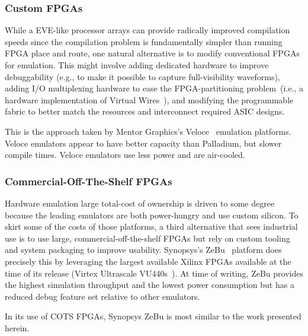 \subsubsection{Custom FPGAs}
While a EVE-like processor arrays can provide radically improved compilation speeds since
the compilation problem is fundamentally simpler than running FPGA place and
route, one natural alternative is to modify conventional FPGAs for emulation.
This might involve adding dedicated hardware to improve debuggability (e.g., to make it
possible to capture full-visibility waveforms), adding I/O multiplexing
hardware to ease the FPGA-partitioning problem~(i.e., a hardware implementation of Virtual Wires~\cite{VirtualWires}), and modifying the programmable
fabric to better match the resources and interconnect required ASIC designs.

This is the approach taken by Mentor Graphics's Veloce~\cite{Veloce} emulation platforms.
Veloce emulators appear to have better capacity than Palladium, but slower
compile times. Veloce emulators use less power and are air-cooled.

\subsubsection{Commercial-Off-The-Shelf FPGAs}

Hardware emulation large total-cost of ownership is driven to some degree
because the leading emulators are both power-hungry and use custom silicon. To
skirt some of the costs of those platforms, a third alternative that sees
industrial use is to use large, commercial-off-the-shelf FPGAs but rely on
custom tooling and system packaging to improve usability. Synopsys's
ZeBu~\cite{ZeBu} platform does precisely this by leveraging the largest
available Xilinx FPGAs available at the time of its release (Virtex Ultrascale
VU440s~\cite{ZeBu}). At time of writing, ZeBu provides the highest simulation
throughput and the lowest power consumption but has a reduced debug feature set
relative to other emulators.

In its use of COTS FPGAs, Synopsys ZeBu is most similar to the work presented herein. 

